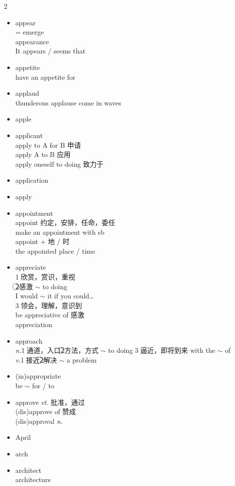 \documentclass[../../book.tex]{subfiles}
\begin{document}
\begin{multicols}{2}
\begin{itemize}
\item[-] appear
\\= emerge
\\appearance
\\It appears / seems that
\item[-] appetite
\\have an appetite for
\item[-] applaud
\\thunderous applause come in waves
\item[-] apple
\item[-] applicant
\\apply to A for B 申请
\\apply A to B 应用
\\apply oneself to doing 致力于
\item[-] application
\item[-] apply
\item[-] appointment
\\appoint 约定，安排，任命，委任
\\make an appointment with sb
\\appoint + 地 / 时
\\the appointed place / time
\item[-] appreciate
\\\textcircled{1}欣赏，赏识，重视
\\\textcircled{2}感激 $\sim$ to doing
\\I would $\sim$ it if you could\ldots
\\\textcircled{3}领会，理解，意识到
\\be appreciative of 感激
\\appreciation
\item[-] approach
\\\emph{n.}\textcircled{1}通道，入口\textcircled{2}方法，方式 $\sim$ to doing%
\textcircled{3}逼近，即将到来 with the $\sim$ of
\\\emph{v.}\textcircled{1}接近\textcircled{2}解决 $\sim$ a problem
\item[-] (in)appropriate
\\be $\sim$ for / to
\item[-] approve \emph{vt.} 批准，通过
\\(dis)approve of 赞成
\\(dis)approval \emph{n.}
\item[-] April
\item[-] arch
\item[-] architect
\\architecture

\end{itemize}
\end{multicols}
\end{document}

